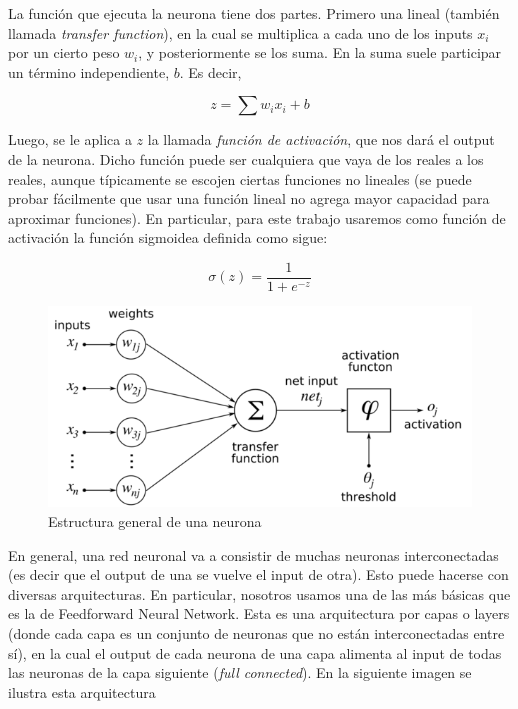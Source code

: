 La función que ejecuta la neurona tiene dos partes. Primero una lineal (también llamada \emph{transfer function}), en la cual se multiplica a cada uno de los inputs $x_i$ por un cierto peso $w_i$, y posteriormente se los suma. En la suma suele participar un término independiente, $b$. Es decir,

$$z = \sum w_i x_i + b$$

Luego, se le aplica a $z$ la llamada \emph{función de activación}, que nos dará el output de la neurona. Dicho función puede ser cualquiera que vaya de los reales a los reales, aunque típicamente se escojen ciertas funciones no lineales (se puede probar fácilmente que usar una función lineal no agrega mayor capacidad para aproximar funciones). En particular, para este trabajo usaremos como función de activación la función sigmoidea definida como sigue:

$$\sigma(z) = \frac{1}{1 + e^{-z}}$$

\begin{figure}
  \begin{center}  
    \includegraphics[width=0.7\linewidth]{imgs/neuron.png}
  \end{center}
  \caption{Estructura general de una neurona}
  \label{fig:neurona}
\end{figure}

En general, una red neuronal va a consistir de muchas neuronas interconectadas (es decir que el output de una se vuelve el input de otra). Esto puede hacerse con diversas arquitecturas. En particular, nosotros usamos una de las más básicas que es la de Feedforward Neural Network. Esta es una arquitectura por capas o layers (donde cada capa es un conjunto de neuronas que no están interconectadas entre sí), en la cual el output de cada neurona de una capa alimenta al input de todas las neuronas de la capa siguiente (\emph{full connected}). En la siguiente imagen se ilustra esta arquitectura

